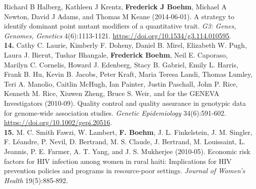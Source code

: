 \documentclass[
  10pt,
]
{article}
\begin{document}
\normalsize Richard B Halberg\normalsize , \normalsize Kathleen J
Krentz\normalsize , \textbf{\normalsize Frederick J Boehm}\normalsize ,
\normalsize Michael A Newton\normalsize , \normalsize David J
Adams\normalsize , and \normalsize Thomas M Keane (2014-06-01). A
strategy to identify dominant point mutant modifiers of a quantitative
trait. \emph{G3: Genes, Genomes, Genetics} 4(6):1113-1121.
\url{https://doi.org/10.1534/g3.114.010595}.\\
\textbf{14.} \normalsize \normalsize Cathy C. Laurie\normalsize ,
\normalsize Kimberly F. Doheny\normalsize , \normalsize Daniel B.
Mirel\normalsize , \normalsize Elizabeth W. Pugh\normalsize ,
\normalsize Laura J. Bierut\normalsize , \normalsize Tushar
Bhangale\normalsize , \textbf{\normalsize Frederick Boehm}\normalsize ,
\normalsize Neil E. Caporaso\normalsize , \normalsize Marilyn C.
Cornelis\normalsize , \normalsize Howard J. Edenberg\normalsize ,
\normalsize Stacy B. Gabriel\normalsize , \normalsize Emily L.
Harris\normalsize , \normalsize Frank B. Hu\normalsize ,
\normalsize Kevin B. Jacobs\normalsize , \normalsize Peter
Kraft\normalsize , \normalsize Maria Teresa Landi\normalsize ,
\normalsize Thomas Lumley\normalsize , \normalsize Teri A.
Manolio\normalsize , \normalsize Caitlin McHugh\normalsize ,
\normalsize Ian Painter\normalsize , \normalsize Justin
Paschall\normalsize , \normalsize John P. Rice\normalsize ,
\normalsize Kenneth M. Rice\normalsize , \normalsize Xiuwen
Zheng\normalsize , \normalsize Bruce S. Weir\normalsize , and for the
GENEVA Investigators (2010-09). Quality control and quality assurance in
genotypic data for genome‐wide association studies. \emph{Genetic
Epidemiology} 34(6):591-602. \url{https://doi.org/10.1002/gepi.20516}.\\
\textbf{15.} \normalsize \normalsize M. C. Smith Fawzi\normalsize ,
\normalsize W. Lambert\normalsize ,
\textbf{\normalsize F. Boehm}\normalsize , \normalsize J. L.
Finkelstein\normalsize , \normalsize J. M. Singler\normalsize ,
\normalsize F. Léandre\normalsize , \normalsize P. Nevil\normalsize ,
\normalsize D. Bertrand\normalsize , \normalsize M. S.
Claude\normalsize , \normalsize J. Bertrand\normalsize , \normalsize M.
Louissaint\normalsize , \normalsize L. Jeannis\normalsize ,
\normalsize P. E. Farmer\normalsize , \normalsize A. T.
Yang\normalsize , and \normalsize J. S. Mukherjee (2010-05). Economic
risk factors for HIV infection among women in rural haiti: Implications
for HIV prevention policies and programs in resource-poor settings.
\emph{Journal of Women's Health} 19(5):885-892.
\end{document}
